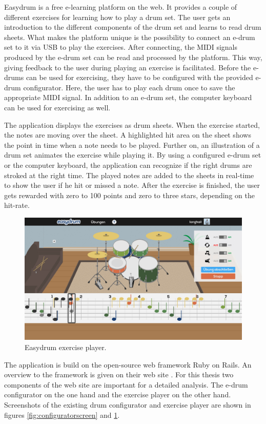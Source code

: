 Easydrum is a free e-learning platform on the web. It provides a couple of different exercises for learning how to play a drum set. The user gets an introduction to the different components of the drum set and learns to read drum sheets. What makes the platform unique is the possibility to connect an e-drum set to it via USB to play the exercises. After connecting, the MIDI signals produced by the e-drum set can be read and processed by the platform. This way, giving feedback to the user during playing an exercise is facilitated. Before the e-drums can be used for exercising, they have to be configured with the provided e-drum configurator. Here, the user has to play each drum once to save the appropriate MIDI signal. In addition to an e-drum set, the computer keyboard can be used for exercising as well.

The application displays the exercises as drum sheets. When the exercise started, the notes are moving over the sheet. A highlighted hit area on the sheet shows the point in time when a note needs to be played. Further on, an illustration of a drum set animates the exercise while playing it. By using a configured e-drum set or the computer keyboard, the application can recognize if the right drums are stroked at the right time. The played notes are added to the sheets in real-time to show the user if he hit or missed a note. After the exercise is finished, the user gets rewarded with zero to 100 points and zero to three stars, depending on the hit-rate.

\begin{figure}[ht]
	\centering
	\includegraphics[width=\textwidth]{images/Easydrum/exerciseplayerscreen.png}
	\caption{Easydrum exercise player.}
	\label{fig:exerciseplayerscreen}
\end{figure}

The application is build on the open-source web framework Ruby on Rails. An overview to the framework is given on their web site \autocite{RubyOnRails:2015}. For this thesis two components of the web site are important for a detailed analysis. The e-drum configurator on the one hand and the exercise player on the other hand. Screenshots of the existing drum configurator and exercise player are shown in figures \ref{fig:configuratorscreen} and \ref{fig:exerciseplayerscreen}. 


